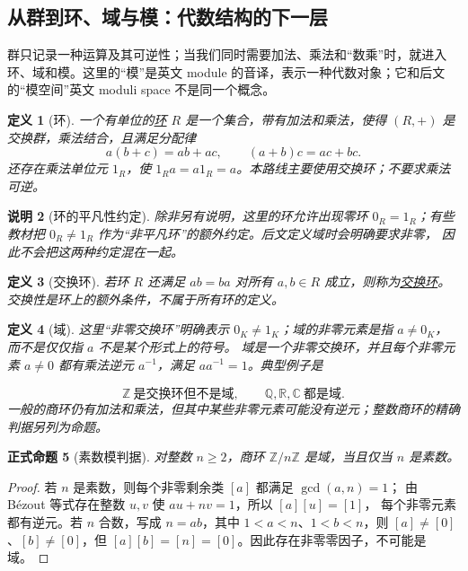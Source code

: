 \documentclass[UTF8,fontset=none,a4paper,11pt]{ctexart}
\theoremstyle{foundation-definition}
\newtheorem{definition}{定义}[section]
\theoremstyle{foundation-theorem}
\theoremstyle{foundation-proposition}
\newtheorem{proposition}[definition]{正式命题}
\theoremstyle{foundation-example}
\theoremstyle{foundation-remark}
\newtheorem{remark}[definition]{说明}
\theoremstyle{foundation-theorem}
\newcommand{\term}[2]{\hyperref[#1]{#2}}
\begin{document}
\subsection{从群到环、域与模：代数结构的下一层}

群只记录一种运算及其可逆性；当我们同时需要加法、乘法和“数乘”时，就进入环、域和模。这里的“模”是英文 module 的音译，表示一种代数对象；它和后文的“模空间”英文 moduli space 不是同一个概念。

\begin{definition}[环]\label{def:ring}
一个有单位的\term{def:ring}{环} \(R\) 是一个集合，带有加法和乘法，使得
\((R,+)\) 是交换群，乘法结合，且满足分配律
\[
a(b+c)=ab+ac,
\qquad
(a+b)c=ac+bc.
\]
还存在乘法单位元 \(1_R\)，使 \(1_Ra=a1_R=a\)。本路线主要使用交换环；不要求乘法可逆。
\end{definition}

\begin{remark}[环的平凡性约定]
除非另有说明，这里的环允许出现零环 \(0_R=1_R\)；有些教材把
\(0_R\ne1_R\) 作为“非平凡环”的额外约定。后文定义域时会明确要求非零，
因此不会把这两种约定混在一起。
\end{remark}

\begin{definition}[交换环]\label{def:commutative-ring}
若环 \(R\) 还满足 \(ab=ba\) 对所有 \(a,b\in R\) 成立，则称为\term{def:commutative-ring}{交换环}。交换性是环上的额外条件，不属于所有环的定义。
\end{definition}

\begin{definition}[域]\label{def:field}
这里“非零交换环”明确表示 \(0_K\ne1_K\)；域的非零元素是指
\(a\ne0_K\)，而不是仅仅指 \(a\) 不是某个形式上的符号。
域是一个非零交换环，并且每个非零元素 \(a\neq0\) 都有乘法逆元 \(a^{-1}\)，满足 \(aa^{-1}=1\)。典型例子是

\[
\mathbb Z\ \text{是交换环但不是域},\qquad
\mathbb Q,\mathbb R,\mathbb C\ \text{都是域}.
\]
一般的商环仍有加法和乘法，但其中某些非零元素可能没有逆元；整数商环的精确判据另列为命题。
\end{definition}

\begin{proposition}[素数模判据]\label{prop:mod-n-field}
对整数 \(n\ge2\)，商环 \(\mathbb Z/n\mathbb Z\) 是域，当且仅当 \(n\) 是素数。
\end{proposition}

\begin{proof}
若 \(n\) 是素数，则每个非零剩余类 \([a]\) 都满足 \(\gcd(a,n)=1\)；
由 Bézout 等式存在整数 \(u,v\) 使 \(au+nv=1\)，所以 \([a][u]=[1]\)，
每个非零元素都有逆元。若 \(n\) 合数，写成 \(n=ab\)，其中
\(1<a<n\)、\(1<b<n\)，则 \([a]\ne[0]\)、\([b]\ne[0]\)，但
\([a][b]=[n]=[0]\)。因此存在非零零因子，不可能是域。
\end{proof}
\end{document}
